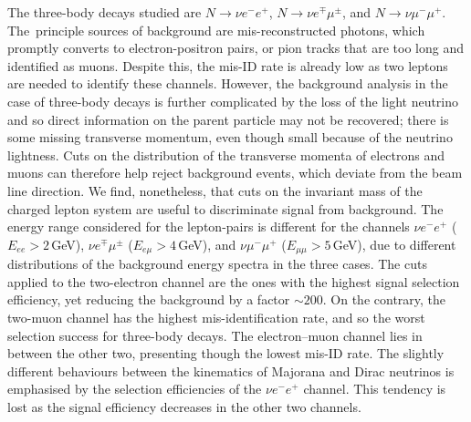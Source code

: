 The three-body decays studied are $N\to \nu e^- e^+$, $N\to \nu e^\mp \mu^\pm$, and $N\to \nu \mu^- \mu^+$.
The~principle sources of background are mis-reconstructed photons, which promptly converts to electron-positron pairs, %
or pion tracks that are too long and identified as muons.
Despite this, the mis-ID rate is already low as two leptons are needed to identify these channels.
However, the background analysis in the case of three-body decays is further complicated by the loss of the light neutrino %
and so direct information on the parent particle may not be recovered; %
there is some missing transverse momentum, even though small because of the neutrino lightness.
Cuts on the distribution of the transverse momenta of electrons and muons can therefore help reject background events, %
which deviate from the beam line direction.
We find, nonetheless, that cuts on the invariant mass of the charged lepton system %
\enlargethispage{\baselineskip}
are useful to discriminate signal from background.
The energy range considered for the lepton-pairs is different for the channels $\nu e^- e^+$ ($E_{ee} > 2$\,GeV), %
$\nu e^\mp \mu^\pm$ ($E_{e\mu} > 4$\,GeV), and $\nu \mu^-\mu^+$ ($E_{\mu\mu} > 5$\,GeV), %
due to  different distributions of the background energy spectra in the three cases.
The cuts applied to the two-electron channel are the ones with the highest signal selection efficiency, %
yet reducing the background by a factor $\sim200$.
On the contrary, the two-muon channel has the highest mis-identification rate, %
and so the worst selection success for three-body decays.
The electron--muon channel lies in between the other two, presenting though the lowest mis-ID rate. 
The slightly different behaviours between the kinematics of Majorana and Dirac neutrinos is emphasised %
by the selection efficiencies of the $\nu e^- e^+$ channel.
This tendency is lost as the signal efficiency decreases in the other two channels.

